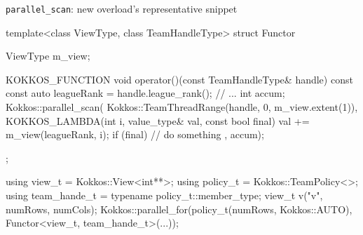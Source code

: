 \begin{frame}[fragile]{\texttt{parallel\_scan}: new overload's representative snippet}

\hspace{-1.1cm}
\begin{code}[keywords={parallel_scan, TeamThreadRange, TeamPolicy}]
  template<class ViewType, class TeamHandleType>
  struct Functor{
    ViewType m_view;

    KOKKOS_FUNCTION void operator()(const TeamHandleType& handle) const{
      const auto leagueRank = handle.league_rank();
      // ...
      int accum;
      Kokkos::parallel_scan(
         Kokkos::TeamThreadRange(handle, 0, m_view.extent(1)),
         KOKKOS_LAMBDA(int i, value_type& val, const bool final) {
           val += m_view(leagueRank, i);
           if (final) { // do something }
         }, accum);
    }};

  using view_t       = Kokkos::View<int**>;
  using policy_t     = Kokkos::TeamPolicy<>;
  using team_hande_t = typename policy_t::member_type;
  view_t v("v", numRows, numCols);
  Kokkos::parallel_for(policy_t(numRows, Kokkos::AUTO),
                       Functor<view_t, team_hande_t>(...));
\end{code}

\end{frame}
